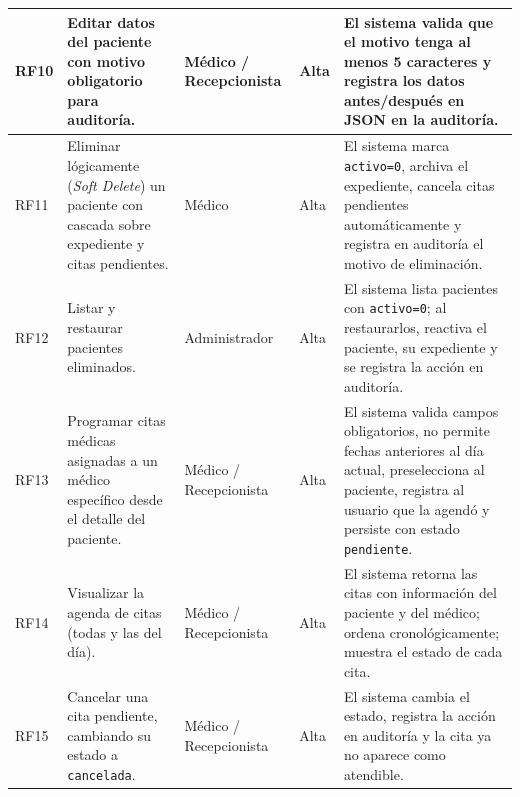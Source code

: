 \documentclass[11pt,a4paper]{article}
\begin{document}
\begin{longtable}{|C{1cm}|L{5cm}|L{2.5cm}|C{1cm}|L{4cm}|}
    RF10        & Editar datos del paciente con motivo obligatorio para auditoría.                                                       & Médico / Recepcionista         & Alta            & El sistema valida que el motivo tenga al menos 5 caracteres y registra los datos antes/después en JSON en la auditoría.                                                                                                    \\
    \hline

    RF11        & Eliminar lógicamente (\textit{Soft Delete}) un paciente con cascada sobre expediente y citas pendientes.               & Médico                         & Alta            & El sistema marca \texttt{activo=0}, archiva el expediente, cancela citas pendientes automáticamente y registra en auditoría el motivo de eliminación.                                                                      \\
    \hline

    RF12        & Listar y restaurar pacientes eliminados.                                                                               & Administrador                  & Alta            & El sistema lista pacientes con \texttt{activo=0}; al restaurarlos, reactiva el paciente, su expediente y se registra la acción en auditoría.                                                                               \\
    \hline

    RF13        & Programar citas médicas asignadas a un médico específico desde el detalle del paciente.                                & Médico / Recepcionista         & Alta            & El sistema valida campos obligatorios, no permite fechas anteriores al día actual, preselecciona al paciente, registra al usuario que la agendó y persiste con estado \texttt{pendiente}.                                  \\
    \hline

    RF14        & Visualizar la agenda de citas (todas y las del día).                                                                   & Médico / Recepcionista         & Alta            & El sistema retorna las citas con información del paciente y del médico; ordena cronológicamente; muestra el estado de cada cita.                                                                                           \\
    \hline

    RF15        & Cancelar una cita pendiente, cambiando su estado a \texttt{cancelada}.                                                 & Médico / Recepcionista         & Alta            & El sistema cambia el estado, registra la acción en auditoría y la cita ya no aparece como atendible.                                                                                                                       \\
    \hline


\end{longtable}
\end{document}
